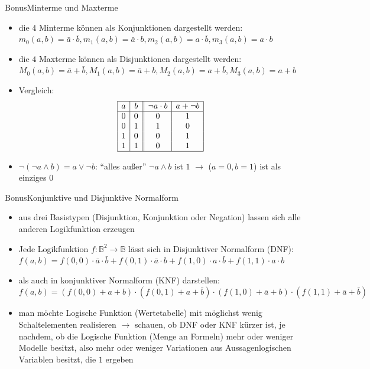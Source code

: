 \begin{frame}{Bonus}{Minterme und Maxterme}
  \begin{itemize}
    \item die $4$ \alert{Minterme} können als \alert{Konjunktionen} dargestellt werden:
      $m_{0}(a, b)=\bar{a} \cdot \bar{b}, m_{1}(a, b)=\bar{a} \cdot b, m_{2}(a, b)=a \cdot \bar{b}, m_{3}(a, b)=a \cdot b$
    \item die $4$ \alert{Maxterme} können als \alert{Disjunktionen} dargestellt werden:
      $M_{0}(a, b)=\bar{a} + \bar{b}, M_{1}(a, b)=\bar{a} + b, M_{2}(a, b)=a + \bar{b}, M_{3}(a, b)=a + b$
    \item \alert{Vergleich:}
      \[
        \begin{array}{|c|c||c|c|}
        \hline a & b & \neg a \cdot b & a + \neg b\\
        \hline 0 & 0 & 0 & 1\\
        0 & 1 & 1 & 0 \\
        1 & 0 & 0 & 1 \\
        1 & 1 & 0 & 1 \\
        \hline
        \end{array}
      \]
    \item $\neg(\neg a \wedge b) = a \vee \neg b$: \enquote{alles außer} $\neg a \wedge b$ ist $1$ $\rightarrow$ ($a=0, b=1$) ist als einziges $0$
  \end{itemize}
\end{frame}

\begin{frame}{Bonus}{Konjunktive und Disjunktive Normalform}
  \begin{itemize}
    \item aus drei \alert{Basistypen} (Disjunktion, Konjunktion oder Negation) lassen sich alle anderen \alert{Logikfunktion} erzeugen
    \item Jede Logikfunktion $f: \mathbb{B}^{2} \rightarrow \mathbb{B}$ lässt sich in \alert{Disjunktiver Normalform (DNF)}:
    $f(a, b)=f(0,0) \cdot \bar{a} \cdot \bar{b}+f(0,1) \cdot \bar{a} \cdot b+f(1,0) \cdot a \cdot \bar{b}+f(1,1) \cdot a \cdot b$
    \item als auch in \alert{konjunktiver Normalform (KNF)} darstellen:
    $f(a, b)=(f(0,0)+a+b) \cdot(f(0,1)+a+\bar{b}) \cdot(f(1,0)+\bar{a}+b) \cdot(f(1,1)+\bar{a}+\bar{b})$
    \item man möchte \alert{Logische Funktion} (Wertetabelle) mit möglichst wenig Schaltelementen realisieren $\rightarrow$ schauen, ob \alert{DNF} oder \alert{KNF} kürzer ist, je nachdem, ob die Logische Funktion (Menge an Formeln) mehr oder weniger \alert{Modelle} besitzt, also mehr oder weniger Variationen aus Aussagenlogischen Variablen besitzt, die $1$ ergeben
  \end{itemize}
\end{frame}

